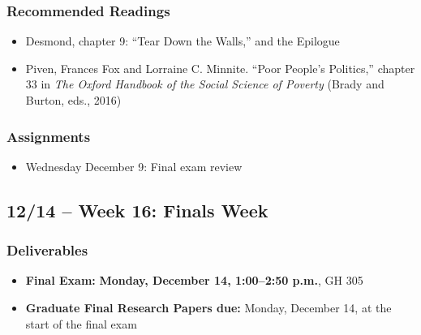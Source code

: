 \documentclass[12pt]{article}
\begin{document}
    \subsubsection*{Recommended Readings}
        \begin{itemize}
            \item Desmond, chapter 9: ``Tear Down the Walls,'' and the Epilogue
            \item Piven, Frances Fox and Lorraine C. Minnite. ``Poor People's Politics,'' chapter 33 in \emph{The Oxford Handbook of the Social Science of Poverty} (Brady and Burton, eds., 2016)
        \end{itemize}
    \subsubsection*{Assignments}
        \begin{itemize}
            \item Wednesday December 9: Final exam review
        \end{itemize}

\subsection*{12/14 -- Week 16: Finals Week}
    \subsubsection*{Deliverables}
        \begin{itemize}
            \item \textbf{Final Exam:} \textbf{Monday, December 14, 1:00--2:50 p.m.}, GH 305
            \item \textbf{Graduate Final Research Papers due:} Monday, December 14, at the start of the final exam
        \end{itemize}
\end{document}
